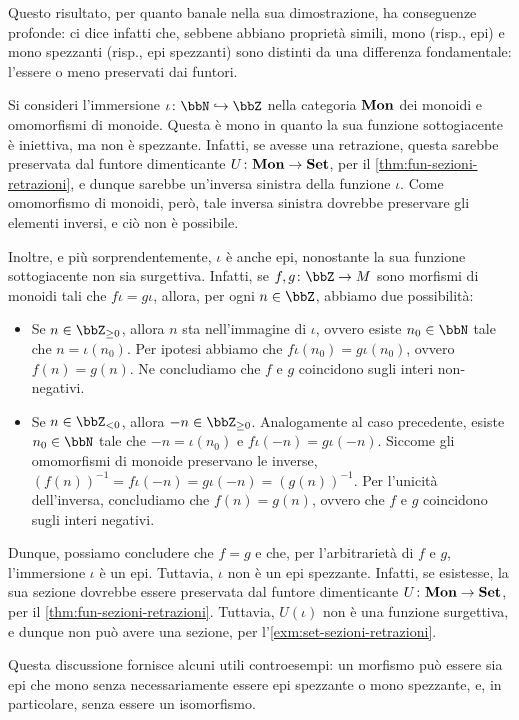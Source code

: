 Questo risultato, per quanto banale nella sua dimostrazione, ha conseguenze profonde:
ci dice infatti che, sebbene abbiano proprietà simili,
mono (risp., epi) e mono spezzanti (risp., epi spezzanti)
sono distinti da una differenza fondamentale:
l'essere o meno preservati dai funtori.

\begin{example}
	Si consideri l'immersione \(\iota \colon \bbN \mono \bbZ\)
	nella categoria \(\mathbf{Mon}\) dei monoidi e omomorfismi di monoide.
	Questa è mono in quanto la sua funzione sottogiacente è iniettiva,
	ma non è spezzante.
	Infatti, se avesse una retrazione,
	questa sarebbe preservata dal funtore dimenticante \(U \colon \mathbf{Mon} \to \mathbf{Set}\),
	per il \autoref{thm:fun-sezioni-retrazioni},
	e dunque sarebbe un'inversa sinistra della funzione \(\iota\).
	Come omomorfismo di monoidi, però, tale inversa sinistra dovrebbe preservare gli elementi inversi,
	e ciò non è possibile.

	Inoltre, e più sorprendentemente, \(\iota\) è anche epi,
	nonostante la sua funzione sottogiacente non sia surgettiva.
	Infatti, se \(f, g \colon \bbZ \to M\) sono morfismi di monoidi tali che \(f \iota = g \iota\),
	allora, per ogni \(n \in \bbZ\),
	abbiamo due possibilità:
	\begin{itemize}
		\item Se \(n \in \bbZ_{\geq 0}\), allora \(n\) sta nell'immagine di \(\iota\),
		      ovvero esiste \(n_0 \in \bbN\) tale che \(n = \iota(n_0)\).
		      Per ipotesi abbiamo che \(f \iota (n_0) = g \iota (n_0)\),
		      ovvero \(f (n) = g (n)\).
		      Ne concludiamo che \(f\) e \(g\) coincidono sugli interi non-negativi.
		\item Se \(n \in \bbZ_{< 0}\), allora \(-n \in \bbZ_{\geq 0}\).
		      Analogamente al caso precedente, esiste \(n_0 \in \bbN\) tale che
		      \(-n = \iota(n_0)\) e \(f \iota (-n) = g \iota (-n)\).
		      Siccome gli omomorfismi di monoide preservano le inverse,
		      \({(f (n))}^{-1} = f \iota {(-n)} = g \iota {(-n)} = {(g (n))}^{-1}\).
		      Per l'unicità dell'inversa, concludiamo che \(f (n) = g (n)\),
		      ovvero che \(f\) e \(g\) coincidono sugli interi negativi.
	\end{itemize}
	Dunque, possiamo concludere che \(f = g\)
	e che, per l'arbitrarietà di \(f\) e \(g\),
	l'immersione \(\iota\) è un epi.
	Tuttavia, \(\iota\) non è un epi spezzante.
	Infatti, se esistesse, la sua sezione dovrebbe essere preservata dal funtore dimenticante \(U \colon \mathbf{Mon} \to \mathbf{Set}\),
	per il \autoref{thm:fun-sezioni-retrazioni}.
	Tuttavia, \(U(\iota)\) non è una funzione surgettiva,
	e dunque non può avere una sezione, per l'\autoref{exm:set-sezioni-retrazioni}.

	Questa discussione fornisce alcuni utili controesempi:
	un morfismo può essere sia epi che mono senza necessariamente essere epi spezzante o mono spezzante,
	e, in particolare, senza essere un isomorfismo.
\end{example}
